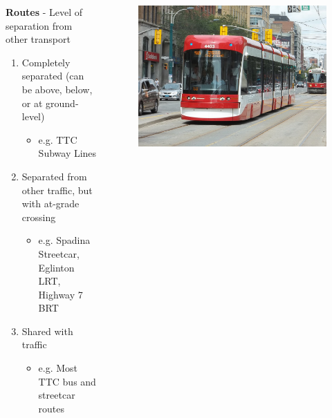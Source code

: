 \documentclass[aspectratio=169]{beamer}
\begin{document}
\begin{frame}
	\begin{columns}
		\begin{column}{0.6\textwidth}
			
			\textbf{Routes} - Level of separation from other transport
			
			
			\begin{enumerate}
				
				\item Completely separated (can be above, below, or at ground-level)
				\begin{itemize}
					\item e.g. TTC Subway Lines
				\end{itemize}
				
				\item Separated from other traffic, but with at-grade crossing
				\begin{itemize}
					\item e.g. Spadina Streetcar, Eglinton LRT, Highway 7 BRT
				\end{itemize}
				
				\item Shared with traffic
				\begin{itemize}
					\item e.g. Most TTC bus and streetcar routes
				\end{itemize}
				
			\end{enumerate}
			
		\end{column}
		
		\begin{column}{0.4\textwidth}
			\begin{figure}
				\centering
				\includegraphics[width=1\linewidth]{images/spadina_streetcar.jpg}
			\end{figure}
			
		\end{column}
		
	\end{columns}
\end{frame}
\end{document}
